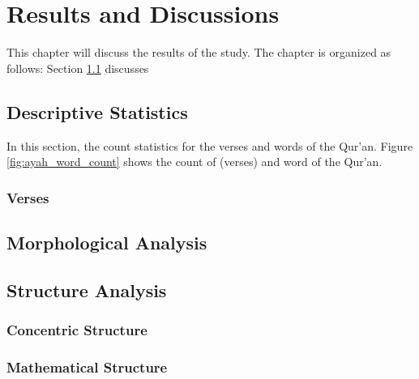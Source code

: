 \chapter{Results and Discussions}
This chapter will discuss the results of the study. The chapter is organized as follows: Section \ref{sec:ch4_desc_stat} discusses 
\section{Descriptive Statistics}\label{sec:ch4_desc_stat}
In this section, the count statistics for the verses and words of the Qur'an. Figure \ref{fig:ayah_word_count} shows the count of   (verses) and word of the Qur'an.
\subsection{Verses}\label{sec:ch4_desc_stat_verse}
\section{Morphological Analysis}
\section{Structure Analysis}
\subsection{Concentric Structure}
\subsection{Mathematical Structure}
